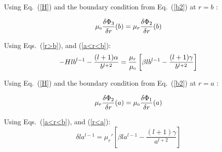 Using Eq.~(\ref{H}) and the boundary condition from Eq.~(\ref{b2}) at $r=b$ :

$$\mu_{\scriptscriptstyle 0}\frac{\delta \Phi_3}{\delta r}(b)=\mu_r\frac{\delta \Phi_2}{\delta r}(b)$$

Using Eqs.~(\ref{r>b}), and (\ref{a<r<b}):
\begin{equation}\label{e03}
-Hlb^{l-1}-\frac{(l+1)\alpha}{b^{l+2}}=\frac{\mu_r}{\mu_{\scriptscriptstyle 0}}\left[\beta l b^{l-1}-\frac{(l+1)\gamma}{b^{l+2}}\right]
\end{equation}

Using Eq.~(\ref{H}) and the boundary condition from Eq.~(\ref{b2}) at $r=a$ :

$$\mu_r\frac{\delta \Phi_2}{\delta r}(a)=\mu_{\scriptscriptstyle 0}\frac{\delta \Phi_1}{\delta r}(a)$$

Using Eqs.~(\ref{a<r<b}), and (\ref{r<a}):
\begin{equation}\label{e04}
\delta l a^{l-1}=\mu_r'\left[\beta l a^{l-1}-\frac{(l+1)\gamma}{a^{l+2}}\right]
\end{equation}




